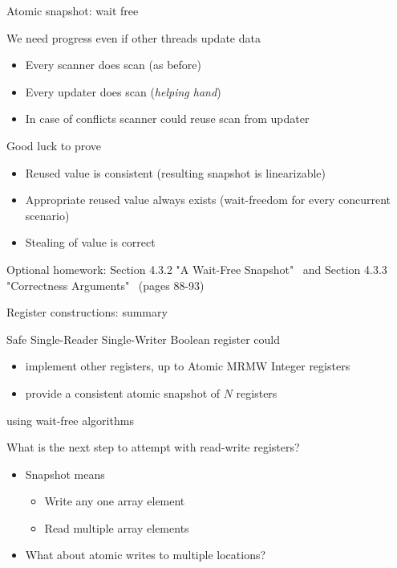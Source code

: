 \begin{frame}{Atomic snapshot: wait free}

We need progress even if other threads update data
\begin{itemize}
  \pause
  \item Every scanner does scan (as before)
  \pause
  \item Every updater does scan  (\textit{helping hand})
  \pause
  \item In case of conflicts scanner could reuse scan from updater
\end{itemize}
\pause
Good luck to prove
\begin{itemize}
  \item Reused value is consistent (resulting snapshot is linearizable)
  \item Appropriate reused value always exists (wait-freedom for every concurrent scenario)
  \item Stealing of value is correct
\end{itemize}

\pause
Optional homework: Section 4.3.2 "A Wait-Free Snapshot" \  and Section 4.3.3 "Correctness Arguments" \ (pages 88-93)

\end{frame}


\begin{frame}{Register constructions: summary}

Safe Single-Reader Single-Writer Boolean register could
\begin{itemize}
  \item implement other registers, up to Atomic MRMW Integer registers
  \item provide a consistent atomic snapshot of $N$ registers
\end{itemize}
using wait-free algorithms

\pause
What is the next step to attempt with read-write registers? 
\pause
\begin{itemize}
  \item Snapshot means
  \begin{itemize}
    \item Write any one array element
    \item Read multiple array elements
  \end{itemize}
  \pause
  \item What about atomic writes to multiple locations?
\end{itemize}
\end{frame}

